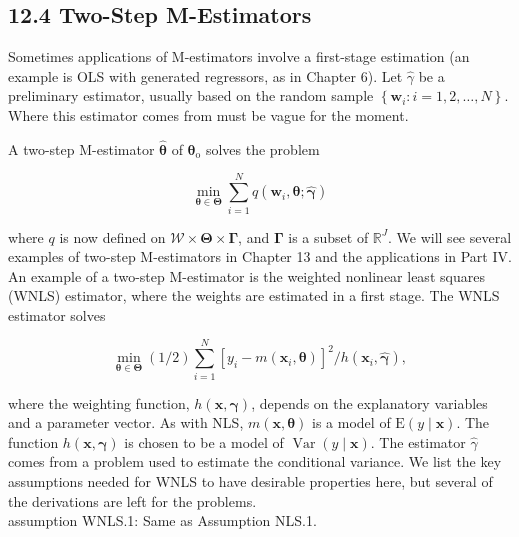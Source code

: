 \documentclass[10pt]{article}
\begin{document}
\subsection*{12.4 Two-Step M-Estimators}
Sometimes applications of M-estimators involve a first-stage estimation (an example is OLS with generated regressors, as in Chapter 6). Let $\hat{\gamma}$ be a preliminary estimator, usually based on the random sample $\left\{\mathbf{w}_{i}: i=1,2, \ldots, N\right\}$. Where this estimator comes from must be vague for the moment.

A two-step M-estimator $\hat{\boldsymbol{\theta}}$ of $\boldsymbol{\theta}_{\mathrm{o}}$ solves the problem


\begin{equation*}
\min _{\boldsymbol{\theta} \in \boldsymbol{\Theta}} \sum_{i=1}^{N} q\left(\mathbf{w}_{i}, \boldsymbol{\theta} ; \hat{\boldsymbol{\gamma}}\right) \tag{12.31}
\end{equation*}


where $q$ is now defined on $\mathscr{W} \times \boldsymbol{\Theta} \times \boldsymbol{\Gamma}$, and $\boldsymbol{\Gamma}$ is a subset of $\mathbb{R}^{J}$. We will see several examples of two-step M-estimators in Chapter 13 and the applications in Part IV. An example of a two-step M-estimator is the weighted nonlinear least squares (WNLS) estimator, where the weights are estimated in a first stage. The WNLS estimator solves


\begin{equation*}
\min _{\boldsymbol{\theta} \in \boldsymbol{\Theta}}(1 / 2) \sum_{i=1}^{N}\left[y_{i}-m\left(\mathbf{x}_{i}, \boldsymbol{\theta}\right)\right]^{2} / h\left(\mathbf{x}_{i}, \hat{\boldsymbol{\gamma}}\right), \tag{12.32}
\end{equation*}


where the weighting function, $h(\mathbf{x}, \boldsymbol{\gamma})$, depends on the explanatory variables and a parameter vector. As with NLS, $m(\mathbf{x}, \boldsymbol{\theta})$ is a model of $\mathrm{E}(y \mid \mathbf{x})$. The function $h(\mathbf{x}, \boldsymbol{\gamma})$ is chosen to be a model of $\operatorname{Var}(y \mid \mathbf{x})$. The estimator $\hat{\gamma}$ comes from a problem used to estimate the conditional variance. We list the key assumptions needed for WNLS to have desirable properties here, but several of the derivations are left for the problems.\\
assumption WNLS.1: Same as Assumption NLS.1.
\end{document}
